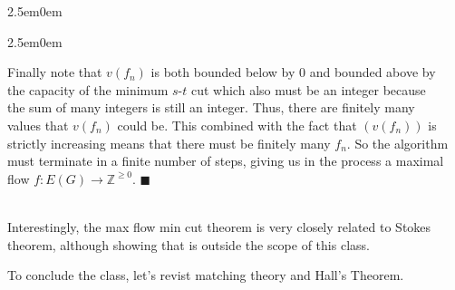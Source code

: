 \documentclass{book}
\newenvironment{myIndent}{%
   \begin{adjustwidth}{2.5em}{0em}%
}{%
   \end{adjustwidth}%
}
\newcommand{\mySepTwo}[1][.]{%
   {\noindent\color{#1}{\rule{6.5in}{0.5mm}}}\\%
}
\newcommand{\retTwo}{\hfill\bigbreak}
\begin{document}
{\begin{myIndent}
{\begin{myIndent}
      Finally note that $v(f_n)$ is both bounded below by $0$ and bounded above by\\ the capacity of the minimum $s$-$t$ cut which also must be an integer because\\ the sum of many integers is still an integer. Thus, there are finitely many\\ values that $v(f_n)$ could be. This combined with the fact that $(v(f_n))$ is\\ strictly increasing means that there must be finitely many $f_n$. So the algorithm\\ must terminate in a finite number of steps, giving us in the process a maximal\\ flow $f: E(G) \rightarrow \mathbb{Z}^{\geq 0}$. $\blacksquare$\retTwo
   \end{myIndent}}
\end{myIndent}}

\mySepTwo

Interestingly, the max flow min cut theorem is very closely related to Stokes\\ theorem, although showing that is outside the scope of this class.\retTwo

To conclude the class, let's revist matching theory and Hall's Theorem.\retTwo
\end{document}
